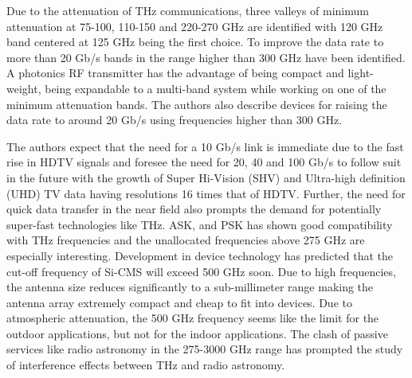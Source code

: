 \documentclass[12pt, letterpaper]{article}
\begin{document}
\par
Due to the attenuation of THz communications, three valleys of minimum attenuation at 75-100, 110-150 and 220-270 GHz are identified with 120 GHz band centered at 125 GHz being the first choice. To improve the data rate to more than 20 Gb/s bands in the range higher than 300 GHz have been identified. A photonics RF transmitter has the advantage of being compact and light-weight, being expandable to a multi-band system while working on one of the minimum attenuation bands. The authors also describe devices for raising the data rate to around 20 Gb/s using frequencies higher than 300 GHz.
\par
The authors expect that the need for a 10 Gb/s link is immediate due to the fast rise in HDTV signals and foresee the need for 20, 40 and 100 Gb/s to follow suit in the future with the growth of Super Hi-Vision (SHV) and Ultra-high definition (UHD) TV data having resolutions 16 times that of HDTV. Further, the need for quick data transfer in the near field also prompts the demand for potentially super-fast technologies like THz. ASK, and PSK has shown good compatibility with THz frequencies and the unallocated frequencies above 275 GHz are especially interesting. Development in device technology has predicted that the cut-off frequency of Si-CMS will exceed 500 GHz soon. Due to high frequencies, the antenna size reduces significantly to a sub-millimeter range making the antenna array extremely compact and cheap to fit into devices. Due to atmospheric attenuation, the 500 GHz frequency seems like the limit for the outdoor applications, but not for the indoor applications. The clash of passive services like radio astronomy in the 275-3000 GHz range has prompted the study of interference effects between THz and radio astronomy. 
\end{document}

